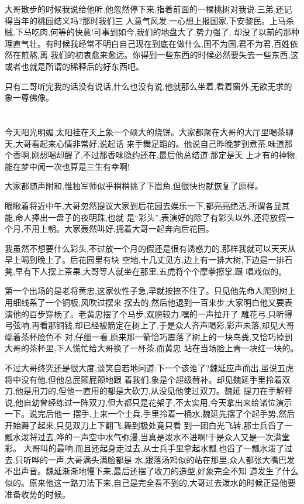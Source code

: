 ﻿\documentclass[12pt,twocolumn]{article}
\begin{document}
大哥散步的时候我说给他听,他忽然停下来,指着前面的一棵桃树对我说:三弟,还记得当年的桃园结义吗?那时我们三
人意气风发,一心想上报国家,下安黎民。上马杀贼,下马吃肉,何等的快意!可事到如今,我们的地盘大了,势力强了,
却没了以前的那种理直气壮。有时候我经常不明白自己现在到底在做什么,国不为国,君不为君,百姓依然在煎熬,离
我们的初衷愈来愈远。你得到一些东西的时候必然要失去一些东西,这或者也就是所谓的稀释后的好东西吧。

只有二哥听完我的话没有说话,什么也没有说,他就那么坐着,看着窗外,无欲无求的象一尊佛像。

\section{}

今天阳光明媚,太阳挂在天上象一个硕大的烧饼。大家都聚在大哥的大厅里喝茶聊天,大哥看起来心情非常好,说起话
来手舞足蹈的。他说自己昨晚梦到煮茶,味道那个香啊,刚想喝却醒了,不过那香味隐约还在,最后他总结道:那定是天
上才有的神物,能在梦中闻一次也算是三生有幸啊!

大家都随声附和,惟独军师似乎稍稍挑了下眉角,但很快也就恢复了原样。

眼瞅着将近中午,大哥忽然提议大家到后花园去娱乐一下,都亮亮绝活,所谓各显其能,命人捧出一盘子的夜明珠,也就
是``彩头'',表演好的除了有彩头以外,还将放假一个月,不用上朝。大家轰然叫好,拥着大哥一起奔向后花园。

我虽然不想要什么彩头,不过放一个月的假还是很有诱惑力的,那样我就可以天天从早上喝到晚上了。后花园里有块
空地,十几丈见方,边上有一排大树,下边是一排石凳,早有下人摆上茶果,大哥等人就坐在那里,五虎将个个摩拳擦掌,跟
唱戏似的。

第一个出场的是老将黄忠,这家伙性子急,早就按捺不住了。只见他先命人爬到树上用细线系了一个铜板,风吹过摆来
摆去的,然后他退到一百来步,大家明白他又要表演他的百步穿杨了。老黄忠摆了个马步,双膀较力,嘿的一声拉开了
雕花弓,只听得弓弦响,再看那铜钱,却已经被箭定在树上了,于是众人齐声喝彩,彩声未落,却见大哥端着茶杯脸色不
对,仔细一看,原来那一箭恰巧震落了树上的一块鸟粪,又恰巧掉到大哥的茶杯里,下人慌忙给大哥换了一杯茶,而黄忠
站在当场脸上青一块红一块的。

不过大哥终究还是很大度,谈笑自若地问道:下一个该谁了?魏延应声而出,虽说五虎将中没有他,但他总屁颠屁颠地跟
着我们,象是个超级替补。却见魏延手里拎着双刀,他是用刀的,但他一直用的都是大砍刀,从没见他使过双刀。魏延
提刀在手解释说,他自幼曾经练过一阵双刀,但大都只是花架子,不太实用,今天拿出来给诸位演示一下。说完后他一
摆手,上来一个士兵,手里拎着一桶水,魏延先摆了个起手势,然后开始舞了起来,只见双刀上下翻飞,舞到极处竟只看
到一团白光飞转,那士兵舀了一瓢水泼将过去,哗的一声空中水气弥漫,当真是泼水不进啊!于是众人又是一次满堂彩。
大哥叫的最响,而且还起身走过去,从士兵手里拿起水瓢,也舀了一瓢水泼了过去,只听哗的一声,大哥满头满脸都是
水,跟落汤鸡似的站在那里,众人都张大嘴巴发不出声音。魏延渐渐地慢下来,最后还摆了收刀的造型,好象完全不知
道发生了什么似的。原来他这一路刀法下来,自己是完全看不到的,大哥过去泼水的时候正是他要准备收势的时候。
\end{document}

